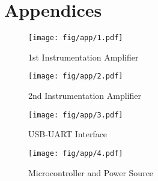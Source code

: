 
\chapter{Appendices}
\label{ch:app}

\label{Appendix A} %


\begin{figure}[h]
	\begin{center}
	\texttt{[image: fig/app/1.pdf]}
	\end{center}
	\vspace{-4mm}
	\caption[1st Instrumentation Amplifier]
	{1st Instrumentation Amplifier}
	\label{fig:app1}
	\vspace{-2mm}
\end{figure}

\begin{figure}[h]
	\begin{center}
	\texttt{[image: fig/app/2.pdf]}
	\end{center}
	\vspace{-4mm}
	\caption[2nd Instrumentation Amplifier]
	{2nd Instrumentation Amplifier}
	\label{fig:app2}
	\vspace{-2mm}
\end{figure}

\begin{figure}[h]
	\begin{center}
	\texttt{[image: fig/app/3.pdf]}
	\end{center}
	\vspace{-4mm}
	\caption[USB-UART Interface]
	{USB-UART Interface}
	\label{fig:app3}
	\vspace{-2mm}
\end{figure}

\begin{figure}[h]
	\begin{center}
	\texttt{[image: fig/app/4.pdf]}
	\end{center}
	\vspace{-4mm}
	\caption[Microcontroller and Power Source]
	{Microcontroller and Power Source}
	\label{fig:app4}
	\vspace{-2mm}
\end{figure}

